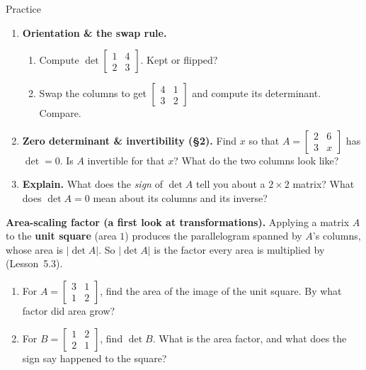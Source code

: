 \documentclass[10pt]{article}
\begin{document}
\begin{notesbox}{Practice}
\begin{enumerate}[leftmargin=1.9em, itemsep=12pt]
\begin{enumerate}[label=(\alph*), leftmargin=1.8em, itemsep=4pt]
    \end{enumerate}
    \vspace{1.0cm}
  \item \textbf{Orientation \& the swap rule.}
    \begin{enumerate}[label=(\alph*), leftmargin=1.8em, itemsep=6pt]
      \item Compute $\det\begin{bmatrix} 1 & 4 \\ 2 & 3 \end{bmatrix}$. Kept or flipped? \vspace{0.5cm}
      \item Swap the columns to get $\begin{bmatrix} 4 & 1 \\ 3 & 2 \end{bmatrix}$ and compute its determinant. Compare. \vspace{0.5cm}
    \end{enumerate}
  \item \textbf{Zero determinant \& invertibility (§2).} Find $x$ so that
        $A=\begin{bmatrix} 2 & 6 \\ 3 & x \end{bmatrix}$ has $\det=0$. Is $A$ invertible for that $x$?
        What do the two columns look like? 
  \item \textbf{Explain.} What does the \emph{sign} of $\det A$ tell you about a $2\times2$ matrix?
        What does $\det A=0$ mean about its columns and its inverse? 
\end{enumerate}
\end{notesbox}

\begin{extensionbox}
\textbf{Area-scaling factor (a first look at transformations).} Applying a matrix $A$ to the
\textbf{unit square} (area $1$) produces the parallelogram spanned by $A$'s columns, whose area is
$|\det A|$. So $|\det A|$ is the factor every area is multiplied by (Lesson~5.3).
\begin{enumerate}[label=(\alph*), leftmargin=1.8em, itemsep=5pt]
  \item For $A=\begin{bmatrix} 3 & 1 \\ 1 & 2 \end{bmatrix}$, find the area of the image of the unit square. By what factor did area grow?
  \item For $B=\begin{bmatrix} 1 & 2 \\ 2 & 1 \end{bmatrix}$, find $\det B$. What is the area factor, and what does the sign say happened to the square?
\end{enumerate}
\end{extensionbox}
\end{document}
